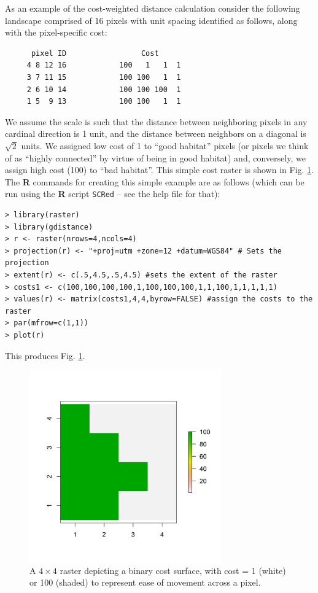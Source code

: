 As an example of the cost-weighted distance calculation consider the
following landscape comprised of 16 pixels with unit spacing
identified as follows, along with the pixel-specific cost:
\begin{center}
\begin{verbatim}
      pixel ID                 Cost
     4 8 12 16            100   1   1  1
     3 7 11 15            100 100   1  1
     2 6 10 14            100 100 100  1
     1 5  9 13            100 100   1  1
\end{verbatim}
\end{center}
We assume the scale is such that the distance between neighboring
pixels in any cardinal direction is 1 unit, and the distance between
neighbors on a diagonal is $\sqrt{2}$ units.  We assigned low cost of
1 to ``good habitat'' pixels (or pixels we think of as ``highly
connected'' by virtue of being in good habitat) and, conversely, we
assign high cost (100) to ``bad habitat''.  This simple cost raster is
shown in Fig. \ref{ecoldist.fig.raster}.  The {\bf R} commands for
creating this simple example are as follows (which can be run using
the {\bf R} script \mbox{\tt SCRed} -- see the help file for that):
\begin{verbatim}
> library(raster)
> library(gdistance)
> r <- raster(nrows=4,ncols=4)
> projection(r) <- "+proj=utm +zone=12 +datum=WGS84" # Sets the projection
> extent(r) <- c(.5,4.5,.5,4.5) #sets the extent of the raster
> costs1 <- c(100,100,100,100,1,100,100,100,1,1,100,1,1,1,1,1)
> values(r) <- matrix(costs1,4,4,byrow=FALSE) #assign the costs to the raster
> par(mfrow=c(1,1))
> plot(r)
\end{verbatim}
This produces Fig. \ref{ecoldist.fig.raster}.

\begin{figure}[h]
\begin{center}
\includegraphics[height=3.25in,width=3.25in]{Ch12-EcolDist/figs/raster_2values}
\end{center}
\caption{A $4 \times 4$ raster depicting a binary cost surface, with cost = 1 (white) or 100 (shaded) to represent ease of movement across a pixel.}
\label{ecoldist.fig.raster}
\end{figure}

